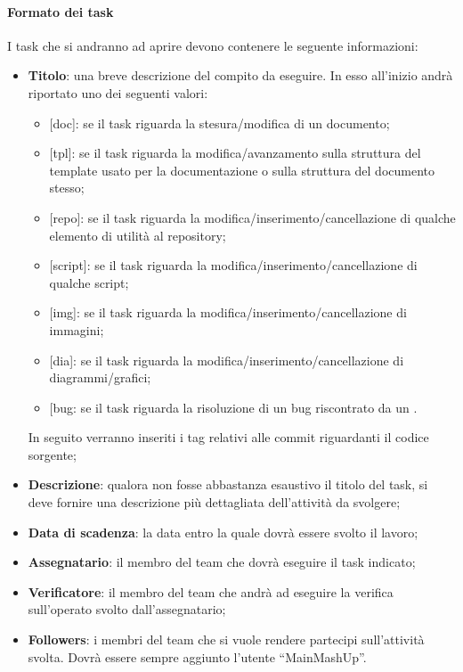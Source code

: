 			\paragraph{Formato dei task}
			\label{par:formato_dei_task}
			I task\gloss{} che si andranno ad aprire devono contenere le seguente informazioni:
				\begin{itemize}
					\item \textbf{Titolo}: una breve descrizione del compito da eseguire. In esso all'inizio andrà riportato uno dei seguenti valori:
						\begin{itemize}
							\item {[}doc{]}: se il task\gloss{} riguarda la stesura/modifica di un documento;
							\item {[}tpl{]}: se il task\gloss{} riguarda la modifica/avanzamento sulla struttura del template\gloss{} usato per la documentazione o sulla struttura del documento stesso;
							\item {[}repo{]}: se il task\gloss{} riguarda la modifica/inserimento/cancellazione di qualche elemento di utilità al repository\gloss{};
							\item {[}script{]}: se il task\gloss{} riguarda la modifica/inserimento/cancellazione di qualche script;
							\item {[}img{]}: se il task\gloss{} riguarda la modifica/inserimento/cancellazione di immagini;
							\item {[}dia{]}: se il task\gloss{} riguarda la modifica/inserimento/cancellazione di diagrammi/grafici;
							\item {[}bug\gloss{}{]}: se il task\gloss{} riguarda la risoluzione di un bug riscontrato da un \roleVerifier.
						\end{itemize}
						\noindent
						In seguito verranno inseriti i tag relativi alle commit\gloss{} riguardanti il codice sorgente;
						
					\item \textbf{Descrizione}: qualora non fosse abbastanza esaustivo il titolo del task\gloss{}, si deve fornire una descrizione più dettagliata dell'attività da svolgere;
					\item \textbf{Data di scadenza}: la data entro la quale dovrà essere svolto il lavoro;
					\item \textbf{Assegnatario}: il membro del team che dovrà eseguire il task\gloss{} indicato;
					\item \textbf{Verificatore}: il membro del team che andrà ad eseguire la verifica sull'operato svolto dall'assegnatario;
					\item \textbf{Followers}: i membri del team che si vuole rendere partecipi sull'attività svolta. Dovrà essere sempre aggiunto l'utente ``MainMashUp''.
				\end{itemize}
